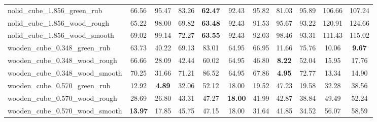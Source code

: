 \begin{table}[H]
{\begin{tabular}{l cccccccccc}
        nolid\_cube\_1.856\_green\_rub & 66.56 & 95.47 & 83.26 & \textbf{62.47} & 92.43 & 95.82 & 81.03 & 95.89 & 106.66 & 107.24 \\
        nolid\_cube\_1.856\_wood\_rough & 65.22 & 98.00 & 69.82 & \textbf{63.48} & 92.43 & 91.53 & 95.67 & 93.22 & 120.91 & 124.66 \\
        nolid\_cube\_1.856\_wood\_smooth & 69.02 & 99.14 & 72.27 & \textbf{63.55} & 92.43 & 92.03 & 98.46 & 93.31 & 111.43 & 115.02 \\
        wooden\_cube\_0.348\_green\_rub & 63.73 & 40.22 & 69.13 & 83.01 & 64.95 & 66.95 & 11.66 & 75.76 & 10.06 & \textbf{9.67} \\
        wooden\_cube\_0.348\_wood\_rough & 66.66 & 28.09 & 42.44 & 60.02 & 64.95 & 46.80 & \textbf{8.22} & 52.04 & 15.95 & 17.76 \\
        wooden\_cube\_0.348\_wood\_smooth & 70.25 & 31.66 & 71.21 & 86.52 & 64.95 & 67.86 & \textbf{4.95} & 72.77 & 13.34 & 14.90 \\
        wooden\_cube\_0.570\_green\_rub & 12.92 & \textbf{4.89} & 32.06 & 52.12 & 18.00 & 19.52 & 47.23 & 19.58 & 32.28 & 38.56 \\
        wooden\_cube\_0.570\_wood\_rough & 28.69 & 26.80 & 43.31 & 47.27 & \textbf{18.00} & 41.99 & 42.87 & 38.84 & 49.49 & 52.24 \\
        wooden\_cube\_0.570\_wood\_smooth & \textbf{13.97} & 17.85 & 45.75 & 47.15 & 18.00 & 31.64 & 41.85 & 34.52 & 56.07 & 58.59 \\
        \bottomrule
    \end{tabular}
    }
\end{table}



\vspace{1cm}

\clearpage

